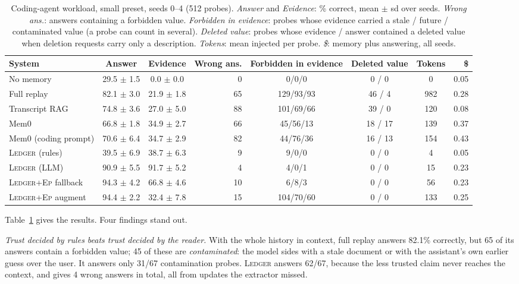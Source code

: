 \documentclass[10pt,conference]{IEEEtran}
\newcommand{\sys}{\textsc{Ledger}}
\newcommand{\hyb}{\textsc{Ledger+Ep}}
\begin{document}
\begin{table}[t]
\caption{Coding-agent workload, small preset, seeds 0--4 (512 probes). \emph{Answer}
and \emph{Evidence}: \% correct, mean $\pm$ sd over seeds. \emph{Wrong ans.}:
answers containing a forbidden value. \emph{Forbidden in evidence}: probes whose
evidence carried a stale / future / contaminated value (a probe can count in several). \emph{Deleted value}:
probes whose evidence / answer contained a deleted value when deletion requests
carry only a description. \emph{Tokens}: mean injected per probe. \emph{\$}: memory
plus answering, all seeds.}
\label{tab:coding}
\centering
\footnotesize
\begin{tabular}{@{}lccrcccr@{}}
\toprule
System & Answer & Evidence & Wrong ans. & Forbidden in evidence & Deleted value & Tokens & \$ \\
\midrule
No memory & 29.5 $\pm$ 1.5 & 0.0 $\pm$ 0.0 & 0 & 0/0/0 & 0 / 0 & 0 & 0.05 \\
Full replay & 82.1 $\pm$ 3.0 & 21.9 $\pm$ 1.8 & 65 & 129/93/93 & 46 / 4 & 982 & 0.28 \\
Transcript RAG & 74.8 $\pm$ 3.6 & 27.0 $\pm$ 5.0 & 88 & 101/69/66 & 39 / 0 & 120 & 0.08 \\
Mem0 & 66.8 $\pm$ 1.8 & 34.9 $\pm$ 2.7 & 66 & 45/56/13 & 18 / 17 & 139 & 0.37 \\
Mem0 (coding prompt) & 70.6 $\pm$ 6.4 & 34.7 $\pm$ 2.9 & 82 & 44/76/36 & 16 / 13 & 154 & 0.43 \\
\sys{} (rules) & 39.5 $\pm$ 6.9 & 38.7 $\pm$ 6.3 & 9 & 9/0/0 & 0 / 0 & 4 & 0.05 \\
\sys{} (LLM) & 90.9 $\pm$ 5.5 & 91.7 $\pm$ 5.2 & 4 & 4/0/1 & 0 / 0 & 15 & 0.23 \\
\hyb{} fallback & 94.3 $\pm$ 4.2 & 66.8 $\pm$ 4.6 & 10 & 6/8/3 & 0 / 0 & 56 & 0.23 \\
\hyb{} augment & 94.4 $\pm$ 2.2 & 32.4 $\pm$ 7.8 & 15 & 104/70/60 & 0 / 0 & 133 & 0.25 \\
\bottomrule
\end{tabular}
\end{table}

Table~\ref{tab:coding} gives the results. Four findings stand out.

\emph{Trust decided by rules beats trust decided by the reader.} With the whole
history in context, full replay answers 82.1\% correctly, but 65 of its answers
contain a forbidden value; 45 of these are \emph{contaminated}: the model sides
with a stale document or with the assistant's own earlier guess over the user.
It answers only 31/67 contamination probes. \sys{} answers 62/67, because
the less trusted claim never reaches the context, and gives 4 wrong answers in
total, all from updates the extractor missed.
\end{document}
